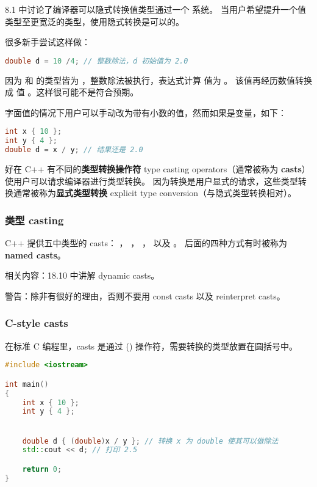 \documentclass[../../LearnCpp.tex]{subfiles}
\begin{document}

8.1 中讨论了编译器可以隐式转换值类型通过一个  系统。
当用户希望提升一个值类型至更宽泛的类型，使用隐式转换是可以的。

很多新手尝试这样做：

\begin{lstlisting}[language=C++]
double d = 10 /4; // 整数除法，d 初始值为 2.0
\end{lstlisting}

因为  和  的类型皆为  ，整数除法被执行，表达式计算  值为  。
该值再经历数值转换成  值  。这样很可能不是符合预期。

字面值的情况下用户可以手动改为带有小数的值，然而如果是变量，如下：

\begin{lstlisting}[language=C++]
int x { 10 };
int y { 4 };
double d = x / y; // 结果还是 2.0
\end{lstlisting}

好在 C++ 有不同的\textbf{类型转换操作符} type casting operators（通常被称为 \textbf{casts}）使用户可以请求编译器进行类型转换。
因为转换是用户显式的请求，这些类型转换通常被称为\textbf{显式类型转换} explicit type conversion（与隐式类型转换相对）。

\subsubsection*{类型 casting}

C++ 提供五中类型的 casts： ， ， ， 以及  。
后面的四种方式有时被称为 \textbf{named casts}。

相关内容：18.10 中讲解 dynamic casts。

警告：除非有很好的理由，否则不要用 const casts 以及 reinterpret casts。

\subsubsection*{C-style casts}

在标准 C 编程里，casts 是通过 () 操作符，需要转换的类型放置在圆括号中。

\begin{lstlisting}[language=C++]
#include <iostream>

int main()
{
    int x { 10 };
    int y { 4 };


    double d { (double)x / y }; // 转换 x 为 double 使其可以做除法
    std::cout << d; // 打印 2.5

    return 0;
}
\end{lstlisting}
\end{document}
